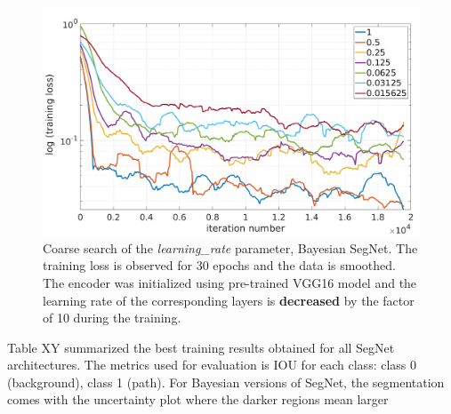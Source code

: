 \vspace{5mm}
\begin{figure}[h]
	\begin{center}
		\includegraphics*[width=14cm, keepaspectratio]{obr/bayes_full_rough_2.png}
	\end{center}
	\vspace{5mm}
	\caption{Coarse search of the \textit{learning\_rate} parameter, Bayesian SegNet. The training loss is observed for 30 epochs and the data is smoothed. The encoder was initialized using pre-trained VGG16 model and the learning rate of the corresponding layers is \textbf{decreased} by the factor of 10 during the training.} 
	\label{}
\end{figure}

Table XY summarized the best training results obtained for all SegNet architectures. The metrics used for evaluation is IOU for each class: class 0 (background), class 1 (path). For Bayesian versions of SegNet, the segmentation comes with the uncertainty plot where the darker regions mean larger 

